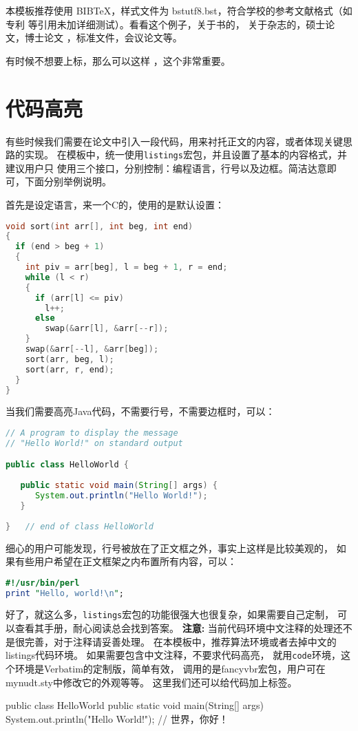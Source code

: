 本模板推荐使用 BIB\TeX，样式文件为 bstutf8.bst，符合学校的参考文献格式（如专利
等引用未加详细测试）。看看这个例子，关于书的，
关于杂志的，硕士论文，博士论文
，标准文件，会议论文等。%

有时候不想要上标，那么可以这样 \cite{shaheshang}，这个非常重要。

\section{代码高亮}
有些时候我们需要在论文中引入一段代码，用来衬托正文的内容，或者体现关键思路的实现。
在模板中，统一使用\texttt{listings}宏包，并且设置了基本的内容格式，并建议用户只
使用三个接口，分别控制：编程语言，行号以及边框。简洁达意即可，下面分别举例说明。

首先是设定语言，来一个C的，使用的是默认设置：
\begin{lstlisting}[language=C]
void sort(int arr[], int beg, int end)
{
  if (end > beg + 1)
  {
    int piv = arr[beg], l = beg + 1, r = end;
    while (l < r)
    {
      if (arr[l] <= piv)
        l++;
      else
        swap(&arr[l], &arr[--r]);
    }
    swap(&arr[--l], &arr[beg]);
    sort(arr, beg, l);
    sort(arr, r, end);
  }
}
\end{lstlisting}

当我们需要高亮Java代码，不需要行号，不需要边框时，可以：
\begin{lstlisting}[language=Java,numbers=none,frame=none]
// A program to display the message
// "Hello World!" on standard output

public class HelloWorld {
 
   public static void main(String[] args) {
      System.out.println("Hello World!");
   }
      
}   // end of class HelloWorld
\end{lstlisting}

细心的用户可能发现，行号被放在了正文框之外，事实上这样是比较美观的，
如果有些用户希望在正文框架之内布置所有内容，可以：
\begin{lstlisting}[language=perl,xleftmargin=2em,framexleftmargin=1.5em]
#!/usr/bin/perl
print "Hello, world!\n";
\end{lstlisting}

好了，就这么多，\texttt{listings}宏包的功能很强大也很复杂，如果需要自己定制，
可以查看其手册，耐心阅读总会找到答案。
\textbf{注意:} 当前代码环境中文注释的处理还不是很完善，对于注释请妥善处理。
在本模板中，推荐算法环境或者去掉中文的listings代码环境。
如果需要包含中文注释，不要求代码高亮，
就用\texttt{code}环境，这个环境是Verbatim的定制版，简单有效，
调用的是fancyvbr宏包，用户可在mynudt.sty中修改它的外观等等。
这里我们还可以给代码加上标签。
\begin{code}[label=hello.c]
public class HelloWorld {
   public static void main(String[] args) {
      System.out.println("Hello World!");
   }
}   // 世界，你好！
\end{code}

